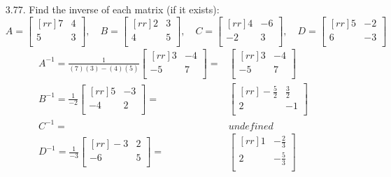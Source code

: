 \documentclass[12pt]{article}
\begin{document}
\begin{enumerate}
\item [3.77.] Find the inverse of each matrix (if it exists):
	\[ 	A= \begin{bmatrix}[rr] 7 & 4\\ 5 & 3\\ \end{bmatrix}, \quad
		B= \begin{bmatrix}[rr] 2 & 3\\ 4 & 5\\ \end{bmatrix}, \quad
		C= \begin{bmatrix}[rr] 4 & -6\\ -2 & 3\\ \end{bmatrix}, \quad
		D= \begin{bmatrix}[rr] 5 & -2\\ 6 & -3\\ \end{bmatrix} \]
	\begin{align*}
		A^{-1}= \frac{1}{(7)(3)-(4)(5)} \begin{bmatrix}[rr] 3 & -4\\ -5 & 7\\ \end{bmatrix}
		= &\begin{bmatrix}[rr] 3 & -4\\ -5 & 7\\ \end{bmatrix}\\
		B^{-1}= \frac{1}{-2} \begin{bmatrix}[rr] 5 & -3\\ -4 & 2\\ \end{bmatrix}
		= &\begin{bmatrix}[rr] -\frac{5}{2} & \frac{3}{2}\\ 2 & -1\\ \end{bmatrix}\\
		C^{-1}=& undefined\\
		D^{-1}= \frac{1}{-3} \begin{bmatrix}[rr] -3 & 2\\ -6 & 5\\ \end{bmatrix}
		= &\begin{bmatrix}[rr] 1 & -\frac{2}{3}\\ 2 & -\frac{5}{3}\\ \end{bmatrix}
	\end{align*}
	

\end{enumerate}
\end{document}
